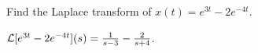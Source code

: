 \documentclass{ximera}
\begin{document}
\begin{exercise} \label{c13.1.0a}
Find the Laplace transform of $x(t)=e^{3t}-2e^{-4t}$.

\begin{solution}
\ans ${\cal L}[e^{3t}-2e^{-4t}](s) = \frac{1}{s-3} -
\frac{2}{s+4}$.

\end{solution}
\end{exercise}
\end{document}
